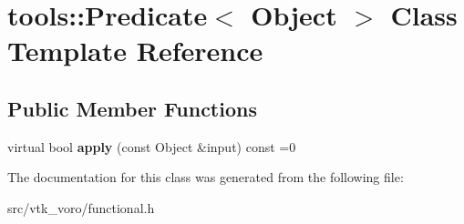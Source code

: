 \hypertarget{classtools_1_1Predicate}{}\section{tools\+:\+:Predicate$<$ Object $>$ Class Template Reference}
\label{classtools_1_1Predicate}
\subsection*{Public Member Functions}
\begin{DoxyCompactItemize}
\item 
virtual bool {\bfseries apply} (const Object \&input) const =0\hypertarget{classtools_1_1Predicate_ae472816f5e3f79d46b9ff6ae748d4d42}{}\label{classtools_1_1Predicate_ae472816f5e3f79d46b9ff6ae748d4d42}

\end{DoxyCompactItemize}


The documentation for this class was generated from the following file\+:\begin{DoxyCompactItemize}
\item 
src/vtk\+\_\+voro/functional.\+h\end{DoxyCompactItemize}
